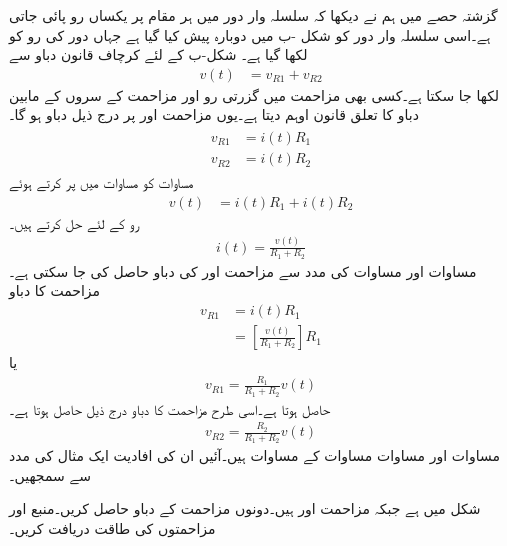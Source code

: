 گزشتہ حصے میں ہم نے دیکھا کہ سلسلہ وار دور میں ہر مقام پر یکساں رو پائی جاتی ہے۔اسی سلسلہ وار دور کو شکل -ب میں دوبارہ پیش کیا گیا ہے جہاں دور کی رو کو  لکھا گیا ہے۔ شکل-ب کے لئے کرچاف قانون دباو سے
\begin{align}\label{مساوات_مزاحمتی_تقسیم_دباو_الف}
v(t)&=v_{R1}+v_{R2}
\end{align}
لکھا جا سکتا ہے۔کسی بھی مزاحمت میں گزرتی رو اور مزاحمت کے سروں کے مابین دباو کا تعلق قانون اوہم دیتا ہے۔یوں مزاحمت  اور  پر درج ذیل دباو ہو گا۔
\begin{gather}
\begin{aligned}\label{مساوات_مزاحمتی_تقسیم_دباو_ب}
v_{R1}&=i(t) R_1 \\
v_{R2}&=i(t) R_2
\end{aligned}
\end{gather}
مساوات  کو مساوات  میں پر کرتے ہوئے
\begin{align}
v(t)&=i(t) R_1+i(t) R_2
\end{align}
رو کے لئے حل کرتے ہیں۔
\begin{align}\label{مساوات_مزاحمتی_تقسیم_دباو_ت}
i(t)=\frac{v(t)}{R_1+R_2}
\end{align}
مساوات  اور مساوات  کی مدد سے مزاحمت  اور  کی دباو حاصل کی جا سکتی ہے۔مزاحمت  کا دباو
\begin{align*}
v_{R1}&=i(t) R_1\\
&=\left[\frac{v(t)}{R_1+R_2}\right] R_1
\end{align*}
یا
\begin{align}\label{مساوات_مزاحمتی_تقسیم_دباو_ٹ}
v_{R1}=\frac{R_1}{R_1+R_2} v(t)
\end{align}
حاصل ہوتا ہے۔اسی طرح مزاحمت  کا دباو درج ذیل حاصل ہوتا ہے۔
\begin{align}\label{مساوات_مزاحمتی_تقسیم_دباو_ث}
v_{R2}=\frac{R_2}{R_1+R_2} v(t)
\end{align}
مساوات  اور مساوات مساوات   کے مساوات ہیں۔آئیں ان کی افادیت ایک مثال کی مدد سے سمجھیں۔

شکل  میں  ہے جبکہ مزاحمت  اور  ہیں۔دونوں مزاحمت کے دباو حاصل کریں۔منبع اور مزاحمتوں کی طاقت دریافت کریں۔

